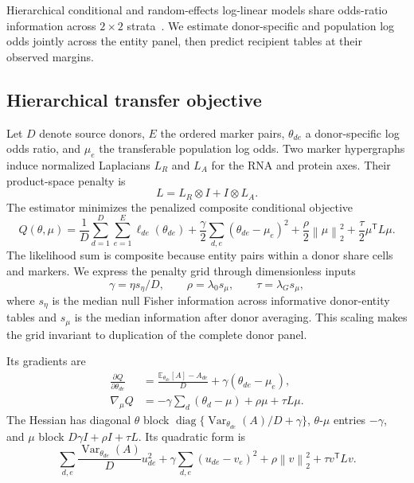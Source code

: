 \documentclass[10pt,a4paper]{article}
\newcommand{\E}{\mathbb{E}}
\newcommand{\norm}[1]{\left\lVert#1\right\rVert}
\begin{document}
Hierarchical conditional and random-effects log-linear models share odds-ratio information across $2\times2$ strata~\cite{liao1999,coullagresti2003,stijnen2010}. We estimate donor-specific and population log odds jointly across the entity panel, then predict recipient tables at their observed margins.

\subsection{Hierarchical transfer objective}

Let $D$ denote source donors, $E$ the ordered marker pairs, $\theta_{de}$ a donor-specific log odds ratio, and $\mu_e$ the transferable population log odds. Two marker hypergraphs induce normalized Laplacians $L_R$ and $L_A$ for the RNA and protein axes. Their product-space penalty is
\begin{equation}
 L=L_R\otimes I+I\otimes L_A.
 \label{eq:product-laplacian}
\end{equation}
The estimator minimizes the penalized composite conditional objective
\begin{equation}
 Q(\theta,\mu)=\frac1D\sum_{d=1}^{D}\sum_{e=1}^{E}\ell_{de}(\theta_{de})
 +\frac{\gamma}{2}\sum_{d,e}(\theta_{de}-\mu_e)^2
 +\frac{\rho}{2}\norm{\mu}_2^2
 +\frac{\tau}{2}\mu^{\mathsf T}L\mu.
 \label{eq:exact-objective}
\end{equation}
The likelihood sum is composite because entity pairs within a donor share cells and markers. We express the penalty grid through dimensionless inputs
\[
 \gamma=\eta s_\eta/D,
 \qquad \rho=\lambda_0s_\mu,
 \qquad \tau=\lambda_Gs_\mu,
\]
where $s_\eta$ is the median null Fisher information across informative donor-entity tables and $s_\mu$ is the median information after donor averaging. This scaling makes the grid invariant to duplication of the complete donor panel.

Its gradients are
\begin{align}
 \frac{\partial Q}{\partial\theta_{de}}
 &=\frac{\E_{\theta_{de}}[A]-A_{de}}{D}
   +\gamma(\theta_{de}-\mu_e),\\
 \nabla_\mu Q
 &=-\gamma\sum_d(\theta_d-\mu)+\rho\mu+\tau L\mu.
 \label{eq:exact-gradients}
\end{align}
The Hessian has diagonal $\theta$ block
$\operatorname{diag}\{\operatorname{Var}_{\theta_{de}}(A)/D+\gamma\}$,
$\theta$-$\mu$ entries $-\gamma$, and $\mu$ block
$D\gamma I+\rho I+\tau L$. Its quadratic form is
\begin{equation}
 \sum_{d,e}\frac{\operatorname{Var}_{\theta_{de}}(A)}{D}u_{de}^2
 +\gamma\sum_{d,e}(u_{de}-v_e)^2
 +\rho\norm{v}_2^2+\tau v^{\mathsf T}Lv.
 \label{eq:exact-hessian-form}
\end{equation}
\end{document}
